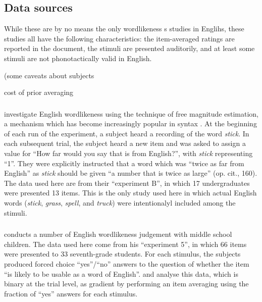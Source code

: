 \subsection{Data sources}

While these are by no means the only wordlikeness s studies in Englihs, these studies all have the following characteristics: 
the item-averaged ratings are reported in the document,
the stimuli are presented auditorily,
and at least some stimuli are not phonotactically valid in English.

(some caveats about subjects

\citep{Shademan2007}

cost of prior averaging
\citep{Baayen2004}

\subsubsection{\citealt{Greenberg1964}}

\citet{Greenberg1964} investigate English wordlikeness using the technique of free magnitude estimation, a mechanism which has become increasingly popular in syntax \citep[e.g.,][]{Bard1996,Sprouse2011}. At the beginning of each run of the experiment, a subject heard a recording of the word \emph{stick}. In each subsequent trial, the subject heard a new item and was asked to assign a value for ``How far would you say that is from English?'', with \emph{stick} representing ``1''. They were explicitly instructed that a word which was ``twice as far from English'' as \emph{stick} should be given ``a number that is twice as large'' (op. cit., 160). The data used here are from their ``experiment B'', in which 17 undergraduates were presented 13 items. This is the only study used here in which actual English words (\emph{stick}, \emph{grass}, \emph{spell}, and \emph{truck}) were intentionalyl included among the stimuli.

\subsubsection{\citealt{Scholes1966}}

\citet{Scholes1966} conducts a number of English wordlikeness judgement with middle school children. The data used here come from his ``experiment 5'', in which 66 items were presented to 33 seventh-grade students. For each stimulus, the subjects produced forced choice ``yes''/``no'' answers to the question of whether the item ``is likely to be usable as a word of English''. \citet{Hayes2008a} and \citet{Albright2009a} analyse this data, which is binary at the trial level, as gradient by performing an item averaging using the fraction of ``yes'' answers for each stimulus.

